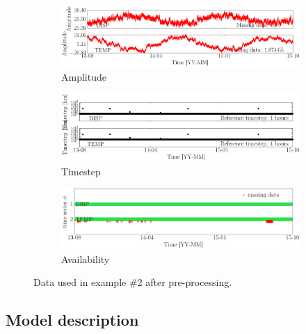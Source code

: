 \begin{figure}[h!]
\centering
\begin{subfigure}{\linewidth}
\includegraphics[width=0.9\linewidth]{./docfigs/Example_DISPTEMPSIM/preprocessed_default/ALL_AMPLITUDES.pdf} 
\caption{Amplitude}
\end{subfigure}
\begin{subfigure}{\linewidth}
\includegraphics[width=0.9\linewidth]{./docfigs/Example_DISPTEMPSIM/preprocessed_default/ALL_TIMESTEPS.pdf}
\caption{Timestep}
\end{subfigure}
\begin{subfigure}{\linewidth}
\includegraphics[width=0.9\linewidth]{./docfigs/Example_DISPTEMPSIM/preprocessed_default/AVAILABILITY.pdf}
\caption{Availability}
\end{subfigure}
\caption{Data used in example \#2 after pre-processing.}
\label{fig:DataSummaryDefaultPreProcessed2}
\end{figure}



\subsection{Model description}
\label{SS:ModelConstructionExample2}

